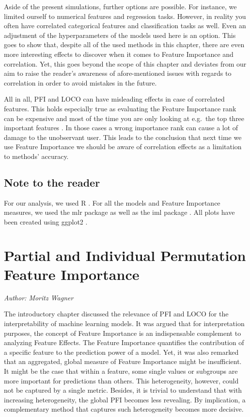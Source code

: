 \documentclass[
]{krantz}
\begin{document}
Aside of the present simulations, further options are possible. For instance, we limited ourself to numerical features and regression tasks. However, in reality you often have correlated categorical features and classification tasks as well. Even an adjustment of the hyperparameters of the models used here is an option. This goes to show that, despite all of the used methods in this chapter, there are even more interesting effects to discover when it comes to Feature Importance and correlation. Yet, this goes beyond the scope of this chapter and deviates from our aim to raise the reader's awareness of afore-mentioned issues with regards to correlation in order to avoid mistakes in the future.

All in all, PFI and LOCO can have misleading effects in case of correlated features. This holds especially true as evaluating the Feature Importance rank can be expensive and most of the time you are only looking at e.g.~the top three important features \citep{molnar2019}. In those cases a wrong importance rank can cause a lot of damage to the unobservant user. This leads to the conclusion that next time we use Feature Importance we should be aware of correlation effects as a limitation to methods' accuracy.

\hypertarget{note-to-the-reader}{%
\section{Note to the reader}\label{note-to-the-reader}}

For our analysis, we used R \citep{R-base}. For all the models and Feature Importance measures,
we used the mlr package \citep{R-mlr} as well as the iml package \citep{molnar2018iml}. All plots have been created using ggplot2 \citep{R-ggplot2}.

\hypertarget{partial-and-individual-permutation-feature-importance}{%
\chapter{Partial and Individual Permutation Feature Importance}\label{partial-and-individual-permutation-feature-importance}}

\emph{Author: Moritz Wagner}

The introductory chapter discussed the relevance of PFI and LOCO for the interpretability of machine learning models. It was argued that for interpretation purposes, the concept of Feature Importance is an indispensable complement to analyzing Feature Effects. The Feature Importance quantifies the contribution of a specific feature to the prediction power of a model. Yet, it was also remarked that an aggregated, global measure of Feature Importance might be insufficient. It might be the case that within a feature, some single values or subgroups are more important for predictions than others. This heterogeneity, however, could not be captured by a single metric. Besides, it is trivial to understand that with increasing heterogeneity, the global PFI becomes less revealing. By implication, a complementary method that captures such heterogeneity becomes more decisive.
\end{document}
